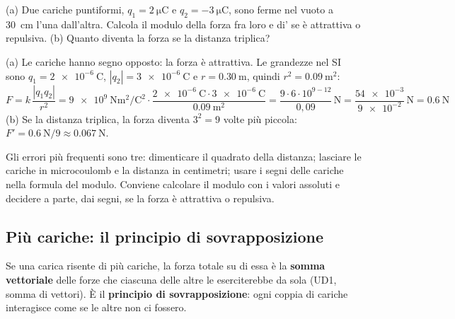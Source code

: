\begin{esempio}
(a) Due cariche puntiformi, $q_1 = \SI{+2}{\micro\coulomb}$ e $q_2 = \SI{-3}{\micro\coulomb}$, sono ferme nel vuoto a \SI{30}{\centi\metre} l'una dall'altra. Calcola il modulo della forza fra loro e di' se è attrattiva o repulsiva. (b) Quanto diventa la forza se la distanza triplica?

(a) Le cariche hanno segno opposto: la forza è attrattiva. Le grandezze nel SI sono $q_1 = \SI{2e-6}{\coulomb}$, $|q_2| = \SI{3e-6}{\coulomb}$ e $r = \SI{0,30}{\metre}$, quindi $r^{2} = \SI{0,09}{\metre\squared}$:
\[
  F = k\,\frac{|q_1 q_2|}{r^{2}} = \SI{9e9}{\newton\metre\squared\per\coulomb\squared} \cdot \frac{\SI{2e-6}{\coulomb} \cdot \SI{3e-6}{\coulomb}}{\SI{0,09}{\metre\squared}} = \frac{9 \cdot 6 \cdot 10^{9-12}}{0{,}09}\,\si{\newton} = \frac{\num{54e-3}}{\num{9e-2}}\,\si{\newton} = \SI{0,6}{\newton}
\]
(b) Se la distanza triplica, la forza diventa $3^{2} = 9$ volte più piccola: $F' = \SI{0,6}{\newton}/9 \approx \SI{0,067}{\newton}$.
\end{esempio}

\begin{attenzione}
Gli errori più frequenti sono tre: dimenticare il quadrato della distanza; lasciare le cariche in microcoulomb e la distanza in centimetri; usare i segni delle cariche nella formula del modulo. Conviene calcolare il modulo con i valori assoluti e decidere a parte, dai segni, se la forza è attrattiva o repulsiva.
\end{attenzione}



\subsection{Più cariche: il principio di sovrapposizione}

Se una carica risente di più cariche, la forza totale su di essa è la \textbf{somma vettoriale} delle forze che ciascuna delle altre le eserciterebbe da sola (UD1, somma di vettori). È il \textbf{principio di sovrapposizione}: ogni coppia di cariche interagisce come se le altre non ci fossero.

